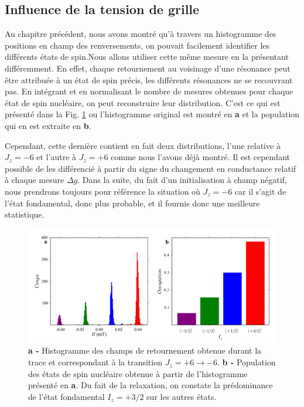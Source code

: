 \subsection{Influence de la tension de grille}
Au chapitre précédent, nous avons montré qu'à travers un histogramme des positions en champ des renversements, on pouvait facilement identifier les différents états de spin.Nous allons utiliser cette m\^eme mesure en la présentant différemment. En effet, chaque retournement au voisinage d'une résonance peut \^etre attribuée à un état de spin précis, les différents résonances ne se recouvrant pas. En intégrant et en normalisant le nombre de mesures obtenues pour chaque état de spin nucléaire, on peut reconstruire leur distribution. C'est ce qui est présenté dans la Fig. \ref{extract_pop} ou l'histogramme original est montré en \textbf{a} et la population qui en est extraite en \textbf{b}.

Cependant, cette dernière contient en fait deux distributions, l'une relative à $J_z=-6$ et l'autre à $J_z=+6$ comme nous l'avons déjà montré. Il est cependant possible de les différencié à partir du signe du changement en conductance relatif à chaque mesure $\Delta g$. Dans la suite, du fait d'un initialisation à champ négatif, nous prendrons toujours pour référence la situation où $J_z=-6$ car il s'agit de l'état fondamental, donc plus probable, et il fournis donc une meilleure statistique.

\begin{figure}
\includegraphics[scale=0.45]{Resultats/PopState/PopState.pdf} 
\caption{\textbf{a -} Histogramme des champs de retournement obtenue durant la trace et correspondant à la transition $J_z = +6 \rightarrow -6$. \textbf{b -} Population des états de spin nucléaire obtenue à partir de l'histogramme présenté en \textbf{a}. Du fait de la relaxation, on constate la prédominance de l'état fondamental $I_z=+3/2$ sur les autres états.}
\label{extract_pop}
\end{figure}

